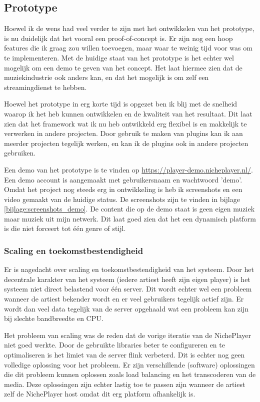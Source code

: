 \subsection{Prototype}
Hoewel ik de wens had veel verder te zijn met het ontwikkelen van het prototype, is nu duidelijk dat het vooral een proof-of-concept is. Er zijn nog een hoop features die ik graag zou willen toevoegen, maar waar te weinig tijd voor was om te implementeren. Met de huidige staat van het prototype is het echter wel mogelijk om een demo te geven van het concept. Het laat hiermee zien dat de muziekindustrie ook anders kan, en dat het mogelijk is om zelf een streamingdienst te hebben.

Hoewel het prototype in erg korte tijd is opgezet ben ik blij met de snelheid waarop ik het heb kunnen ontwikkelen en de kwaliteit van het resultaat. Dit laat zien dat het framework wat ik nu heb ontwikkeld erg flexibel is en makkelijk te verwerken in andere projecten. Door gebruik te maken van plugins kan ik aan meerder projecten tegelijk werken, en kan ik de plugins ook in andere projecten gebruiken.

Een demo van het prototype is te vinden op \url{https://player-demo.nicheplayer.nl/}. Een demo account is aangemaakt met gebruikersnaam en wachtwoord 'demo'. Omdat het project nog steeds erg in ontwikkeling is heb ik screenshots en een video gemaakt van de huidige status. De screenshots zijn te vinden in bijlage \ref{bijlage:screenshots_demo}. De content die op de demo staat is geen eigen muziek maar muziek uit mijn netwerk. Dit laat goed zien dat het een dynamisch platform is die niet forceert tot één genre of stijl.

\subsubsection*{Scaling en toekomstbestendigheid}
Er is nagedacht over scaling en toekomstbestendigheid van het systeem. Door het decentrale karakter van het systeem (iedere artiest heeft zijn eigen player) is het systeem niet direct belastend voor één server. Dit wordt echter wel een probleem wanneer de artiest bekender wordt en er veel gebruikers tegelijk actief zijn. Er wordt dan veel data tegelijk van de server opgehaald wat een probleem kan zijn bij slechte bandbreedte en CPU.

Het probleem van scaling was de reden dat de vorige iteratie van de NichePlayer niet goed werkte. Door de gebruikte libraries beter te configureren en te optimaliseren is het limiet van de server flink verbeterd. Dit is echter nog geen volledige oplossing voor het probleem. Er zijn verschillende (software) oplossingen die dit probleem kunnen oplossen zoals load balancing en het transcoderen van de media. Deze oplossingen zijn echter lastig toe te passen zijn wanneer de artiest zelf de NichePlayer host omdat dit erg platform afhankelijk is. 

